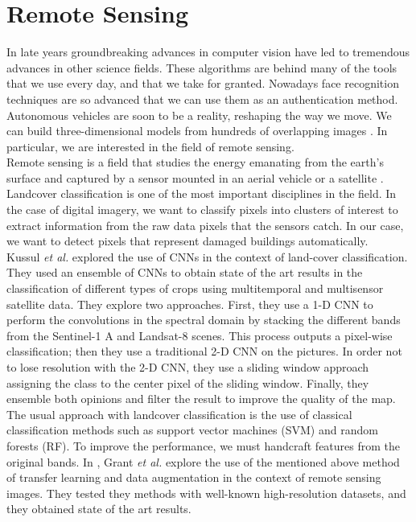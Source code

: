 \section{Remote Sensing}

In late years groundbreaking advances in computer vision have led to tremendous advances in other science fields. These algorithms are behind many of the tools that we use every day, and that we take for granted. Nowadays face recognition techniques are so advanced that we can use them as an authentication method. Autonomous vehicles are soon to be a reality, reshaping the way we move. We can build three-dimensional models from hundreds of overlapping images \cite{Szeliski:2010:CVA:1941882}. In particular, we are interested in the field of remote sensing.\\

Remote sensing is a field that studies the energy emanating from the earth's surface and captured by a sensor mounted in an aerial vehicle or a satellite \cite{richards2013remote}. Landcover classification is one of the most important disciplines in the field. In the case of digital imagery, we want to classify pixels into clusters of interest to extract information from the raw data pixels that the sensors catch. In our case, we want to detect pixels that represent damaged buildings automatically.\\

Kussul \textit{et al.} \cite{7891032} explored the use of CNNs in the context of land-cover classification. They used an ensemble of CNNs to obtain state of the art results in the classification of different types of crops using multitemporal and multisensor satellite data. They explore two approaches. First, they use a 1-D CNN to perform the convolutions in the spectral domain by stacking the different bands from the Sentinel-1 A and Landsat-8 scenes. This process outputs a pixel-wise classification; then they use a traditional 2-D CNN on the pictures. In order not to lose resolution with the 2-D CNN, they use a sliding window approach assigning the class to the center pixel of the sliding window. Finally, they ensemble both opinions and filter the result to improve the quality of the map.\\

The usual approach with landcover classification is the use of classical classification methods such as support vector machines (SVM) and random forests (RF). To improve the performance, we must handcraft features from the original bands. In \cite{7858676}, Grant \textit{et al.} explore the use of the mentioned above method of transfer learning and data augmentation in the context of remote sensing images. They tested they methods with well-known high-resolution datasets, and they obtained state of the art results.\\


